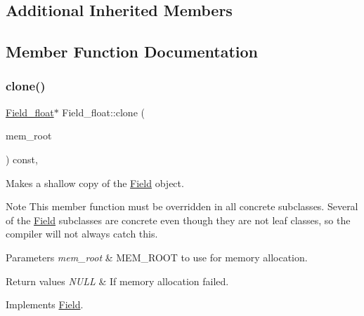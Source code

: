 \subsection*{Additional Inherited Members}


\subsection{Member Function Documentation}
\mbox{\label{classField__float_aa5db4ffb8e16aa4ef8b5d3e622be07ac}} 
\subsubsection{\texorpdfstring{clone()}{clone()}\hspace{0.1cm}{\footnotesize\ttfamily [1/2]}}
{\footnotesize\ttfamily \mbox{\hyperlink{classField__float}{Field\+\_\+float}}$\ast$ Field\+\_\+float\+::clone (\begin{DoxyParamCaption}\item[{M\+E\+M\+\_\+\+R\+O\+OT $\ast$}]{mem\+\_\+root }\end{DoxyParamCaption}) const\hspace{0.3cm}{\ttfamily [inline]}, {\ttfamily [virtual]}}

Makes a shallow copy of the \mbox{\hyperlink{classField}{Field}} object.

\begin{DoxyNote}{Note}
This member function must be overridden in all concrete subclasses. Several of the \mbox{\hyperlink{classField}{Field}} subclasses are concrete even though they are not leaf classes, so the compiler will not always catch this.
\end{DoxyNote}

\begin{DoxyParams}{Parameters}
{\em mem\+\_\+root} & M\+E\+M\+\_\+\+R\+O\+OT to use for memory allocation. \\
\hline
\end{DoxyParams}

\begin{DoxyRetVals}{Return values}
{\em N\+U\+LL} & If memory allocation failed. \\
\hline
\end{DoxyRetVals}


Implements \mbox{\hyperlink{classField_a64979bcb9345803b031fff76a0c3d9fe}{Field}}.

